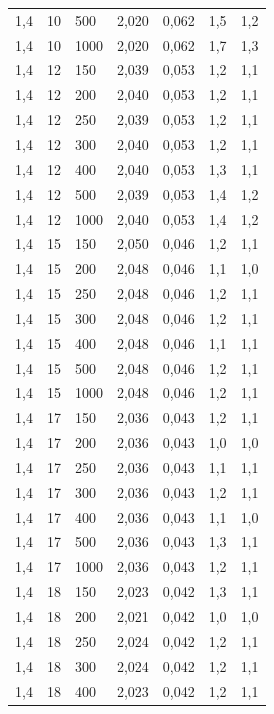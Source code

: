 \begin{tabular}{lllllll}
        1,4 & 10 & 500 & 2,020 & 0,062 & 1,5 & 1,2 \\ 
        1,4 & 10 & 1000 & 2,020 & 0,062 & 1,7 & 1,3 \\ 
        1,4 & 12 & 150 & 2,039 & 0,053 & 1,2 & 1,1 \\ 
        1,4 & 12 & 200 & 2,040 & 0,053 & 1,2 & 1,1 \\ 
        1,4 & 12 & 250 & 2,039 & 0,053 & 1,2 & 1,1 \\ 
        1,4 & 12 & 300 & 2,040 & 0,053 & 1,2 & 1,1 \\ 
        1,4 & 12 & 400 & 2,040 & 0,053 & 1,3 & 1,1 \\ 
        1,4 & 12 & 500 & 2,039 & 0,053 & 1,4 & 1,2 \\ 
        1,4 & 12 & 1000 & 2,040 & 0,053 & 1,4 & 1,2 \\ 
        1,4 & 15 & 150 & 2,050 & 0,046 & 1,2 & 1,1 \\ 
        1,4 & 15 & 200 & 2,048 & 0,046 & 1,1 & 1,0 \\ 
        1,4 & 15 & 250 & 2,048 & 0,046 & 1,2 & 1,1 \\ 
        1,4 & 15 & 300 & 2,048 & 0,046 & 1,2 & 1,1 \\ 
        1,4 & 15 & 400 & 2,048 & 0,046 & 1,1 & 1,1 \\ 
        1,4 & 15 & 500 & 2,048 & 0,046 & 1,2 & 1,1 \\ 
        1,4 & 15 & 1000 & 2,048 & 0,046 & 1,2 & 1,1 \\ 
        1,4 & 17 & 150 & 2,036 & 0,043 & 1,2 & 1,1 \\ 
        1,4 & 17 & 200 & 2,036 & 0,043 & 1,0 & 1,0 \\ 
        1,4 & 17 & 250 & 2,036 & 0,043 & 1,1 & 1,1 \\ 
        1,4 & 17 & 300 & 2,036 & 0,043 & 1,2 & 1,1 \\ 
        1,4 & 17 & 400 & 2,036 & 0,043 & 1,1 & 1,0 \\ 
        1,4 & 17 & 500 & 2,036 & 0,043 & 1,3 & 1,1 \\ 
        1,4 & 17 & 1000 & 2,036 & 0,043 & 1,2 & 1,1 \\ 
        1,4 & 18 & 150 & 2,023 & 0,042 & 1,3 & 1,1 \\ 
        1,4 & 18 & 200 & 2,021 & 0,042 & 1,0 & 1,0 \\ 
        1,4 & 18 & 250 & 2,024 & 0,042 & 1,2 & 1,1 \\ 
        1,4 & 18 & 300 & 2,024 & 0,042 & 1,2 & 1,1 \\ 
        1,4 & 18 & 400 & 2,023 & 0,042 & 1,2 & 1,1 \\ 

\end{tabular}
